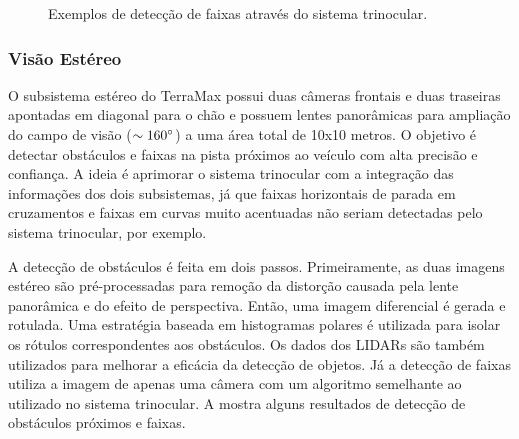 \begin{figure}[h]
\centering
{}\quad
{}
\caption{Exemplos de detecção de faixas através do sistema trinocular.}%
\label{fig:trinocular_lane}%
\end{figure}


\subsubsection{Visão Estéreo}

O subsistema estéreo do TerraMax possui duas câmeras frontais e duas traseiras apontadas em diagonal para o chão e possuem lentes panorâmicas para ampliação do campo de visão ($\sim160^{\circ}$) a uma área total de 10x10 metros. O objetivo é detectar obstáculos e faixas na pista próximos ao veículo com alta precisão e confiança. A ideia é aprimorar o sistema trinocular com a integração das informações dos dois subsistemas, já que faixas horizontais de parada em cruzamentos e faixas em curvas muito acentuadas não seriam detectadas pelo sistema trinocular, por exemplo.

A detecção de obstáculos é feita em dois passos. Primeiramente, as duas imagens estéreo são pré-processadas para remoção da distorção causada pela lente panorâmica e do efeito de perspectiva. Então, uma imagem diferencial é gerada e rotulada. Uma estratégia baseada em histogramas polares é utilizada para isolar os rótulos correspondentes aos obstáculos. Os dados dos LIDARs são também utilizados para melhorar a eficácia da detecção de objetos. Já a detecção de faixas utiliza a imagem de apenas uma câmera com um algoritmo semelhante ao utilizado no sistema trinocular. A  mostra alguns resultados de detecção de obstáculos próximos e faixas.

